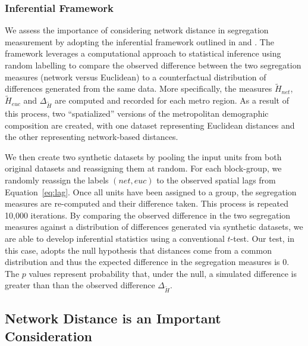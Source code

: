 \documentclass[
  10pt,
]{article}
\begin{document}
\hypertarget{inferential-framework}{%
\subsubsection{Inferential Framework}\label{inferential-framework}}

We assess the importance of considering network distance in segregation
measurement by adopting the inferential framework outlined in
\citet{rey2021ComparativeSpatial} and
\citet{cortes2020OpensourceFramework}. The framework leverages a
computational approach to statistical inference using random labelling
to compare the observed difference between the two segregation measures
(network versus Euclidean) to a counterfactual distribution of
differences generated from the same data. More specifically, the
measures \(\tilde{H}_{net}\), \(\tilde{H}_{euc}\) and
\(\Delta_{\tilde{H}}\) are computed and recorded for each metro region.
As a result of this process, two ``spatialized'' versions of the
metropolitan demographic composition are created, with one dataset
representing Euclidean distances and the other representing
network-based distances.

We then create two synthetic datasets by pooling the input units from
both original datasets and reassigning them at random. For each
block-group, we randomly reassign the labels \((net,euc)\) to the
observed spatial lags from Equation~\ref{eq:lag}. Once all units have
been assigned to a group, the segregation measures are re-computed and
their difference taken. This process is repeated 10,000 iterations. By
comparing the observed difference in the two segregation measures
against a distribution of differences generated via synthetic datasets,
we are able to develop inferential statistics using a conventional
\(t\)-test. Our test, in this case, adopts the null hypothesis that
distances come from a common distribution and thus the expected
difference in the segregation measures is 0. The \(p\) values represent
probability that, under the null, a simulated difference is greater than
than the observed difference \(\Delta_{\tilde{H}}\).

\hypertarget{network-distance-is-an-important-consideration}{%
\subsection{Network Distance is an Important
Consideration}\label{network-distance-is-an-important-consideration}}
\end{document}
